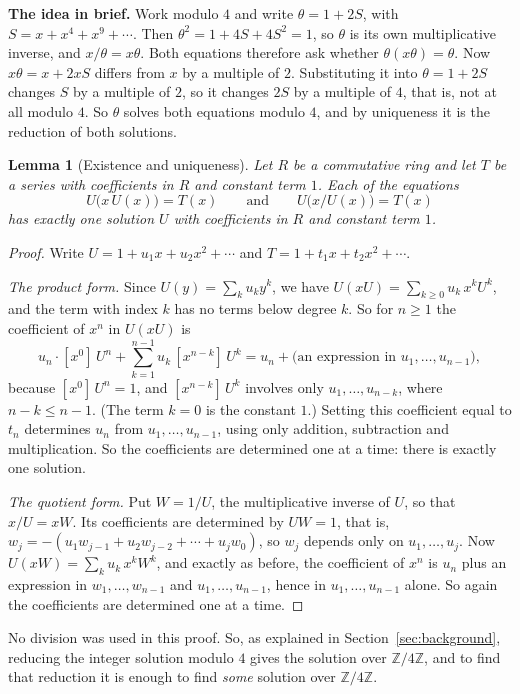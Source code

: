 \documentclass[11pt,a4paper]{article}
\newtheorem{lemma}[theorem]{Lemma}
\theoremstyle{definition}
\theoremstyle{remark}
\newcommand{\Z}{\mathbb{Z}}
\newcommand{\coeff}[2]{[x^{#1}]\,#2}
\newcommand{\para}[1]{\par\medskip\noindent\textbf{#1}\enspace}
\begin{document}
\para{The idea in brief.} Work modulo $4$ and write $\theta=1+2S$, with $S=x+x^4+x^9+\cdots$. Then
$\theta^2=1+4S+4S^2=1$, so $\theta$ is its own multiplicative inverse, and $x/\theta=x\theta$. Both equations therefore
ask whether $\theta(x\theta)=\theta$. Now $x\theta=x+2xS$ differs from $x$ by a multiple of $2$. Substituting it into
$\theta=1+2S$ changes $S$ by a multiple of $2$, so it changes $2S$ by a multiple of $4$, that is, not at all modulo $4$.
So $\theta$ solves both equations modulo $4$, and by uniqueness it is the reduction of both solutions.

\begin{lemma}[Existence and uniqueness]\label{lem:unique}
Let $R$ be a commutative ring and let $T$ be a series with coefficients in $R$ and constant term $1$. Each of the
equations
\[
U\bigl(x\,U(x)\bigr)=T(x)\qquad\text{and}\qquad U\bigl(x/U(x)\bigr)=T(x)
\]
has exactly one solution $U$ with coefficients in $R$ and constant term $1$.
\end{lemma}

\begin{proof}
Write $U=1+u_1x+u_2x^2+\cdots$ and $T=1+t_1x+t_2x^2+\cdots$.

\emph{The product form.} Since $U(y)=\sum_ku_ky^k$, we have $U(xU)=\sum_{k\ge0}u_k\,x^kU^k$, and the term with index $k$
has no terms below degree $k$. So for $n\ge1$ the coefficient of $x^n$ in $U(xU)$ is
\[
u_n\cdot\coeff{0}{U^n}+\sum_{k=1}^{n-1}u_k\,\coeff{n-k}{U^k}
=u_n+\bigl(\text{an expression in }u_1,\dots,u_{n-1}\bigr),
\]
because $\coeff{0}{U^n}=1$, and $\coeff{n-k}{U^k}$ involves only $u_1,\dots,u_{n-k}$, where $n-k\le n-1$. (The term
$k=0$ is the constant $1$.) Setting this coefficient equal to $t_n$ determines $u_n$ from $u_1,\dots,u_{n-1}$, using only
addition, subtraction and multiplication. So the coefficients are determined one at a time: there is exactly one
solution.

\emph{The quotient form.} Put $W=1/U$, the multiplicative inverse of $U$, so that $x/U=xW$. Its coefficients are
determined by $UW=1$, that is, $w_j=-(u_1w_{j-1}+u_2w_{j-2}+\cdots+u_jw_0)$, so $w_j$ depends only on $u_1,\dots,u_j$.
Now $U(xW)=\sum_ku_k\,x^kW^k$, and exactly as before, the coefficient of $x^n$ is $u_n$ plus an expression in
$w_1,\dots,w_{n-1}$ and $u_1,\dots,u_{n-1}$, hence in $u_1,\dots,u_{n-1}$ alone. So again the coefficients are determined
one at a time.
\end{proof}

No division was used in this proof. So, as explained in Section~\ref{sec:background}, reducing the integer solution
modulo $4$ gives the solution over $\Z/4\Z$, and to find that reduction it is enough to find \emph{some} solution over
$\Z/4\Z$.
\end{document}
